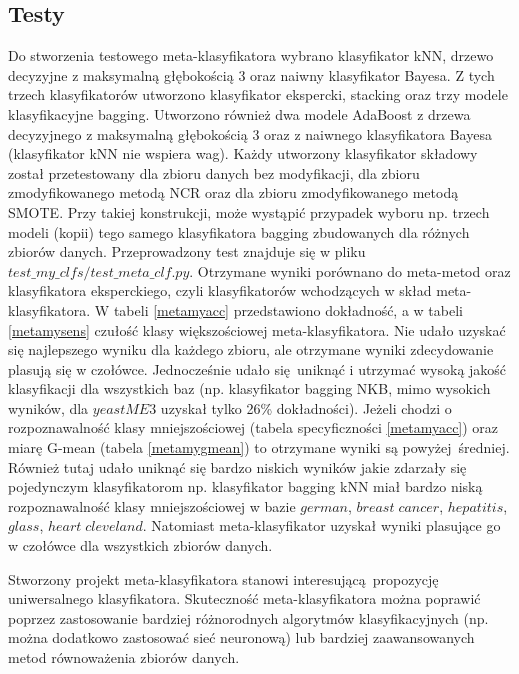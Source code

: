 \subsection{Testy}
Do stworzenia testowego meta-klasyfikatora wybrano klasyfikator kNN, drzewo decyzyjne z maksymalną głębokością 3 oraz naiwny klasyfikator Bayesa. Z tych trzech klasyfikatorów utworzono klasyfikator ekspercki, stacking oraz trzy modele klasyfikacyjne bagging. Utworzono również dwa modele AdaBoost z drzewa decyzyjnego z maksymalną głębokością 3 oraz z naiwnego klasyfikatora Bayesa (klasyfikator kNN nie wspiera wag). Każdy utworzony klasyfikator składowy został przetestowany dla zbioru danych bez modyfikacji, dla zbioru zmodyfikowanego metodą NCR oraz dla zbioru zmodyfikowanego metodą SMOTE. Przy takiej konstrukcji, może wystąpić przypadek wyboru np. trzech modeli (kopii) tego samego klasyfikatora bagging zbudowanych dla różnych zbiorów danych. Przeprowadzony test znajduje się w pliku $test\_my\_clfs/test\_meta\_clf.py$. Otrzymane wyniki porównano do meta-metod oraz klasyfikatora eksperckiego, czyli klasyfikatorów wchodzących w skład meta-klasyfikatora. W tabeli \ref{metamyacc} przedstawiono dokładność, a w tabeli \ref{metamysens} czułość klasy większościowej meta-klasyfikatora. Nie udało uzyskać się najlepszego wyniku dla każdego zbioru, ale otrzymane wyniki zdecydowanie plasują się w czołówce. Jednocześnie udało się uniknąć i utrzymać wysoką jakość klasyfikacji dla wszystkich baz (np. klasyfikator bagging NKB, mimo wysokich wyników, dla $yeastME3$ uzyskał tylko 26\% dokładności). Jeżeli chodzi o rozpoznawalność klasy mniejszościowej (tabela specyficzności \ref{metamyacc}) oraz miarę G-mean (tabela \ref{metamygmean}) to otrzymane wyniki są powyżej średniej. Również tutaj udało uniknąć się bardzo niskich wyników jakie zdarzały się pojedynczym klasyfikatorom np. klasyfikator bagging kNN miał bardzo niską rozpoznawalność klasy mniejszościowej w bazie $german$, $breast\; cancer$, $hepatitis$, $glass$, $heart\; cleveland$. Natomiast meta-klasyfikator uzyskał wyniki plasujące go w czołówce dla wszystkich zbiorów danych. \par
Stworzony projekt meta-klasyfikatora stanowi interesującą propozycję uniwersalnego klasyfikatora. Skuteczność meta-klasyfikatora można poprawić poprzez zastosowanie bardziej różnorodnych algorytmów klasyfikacyjnych (np. można dodatkowo zastosować sieć neuronową) lub bardziej zaawansowanych metod równoważenia zbiorów danych.
